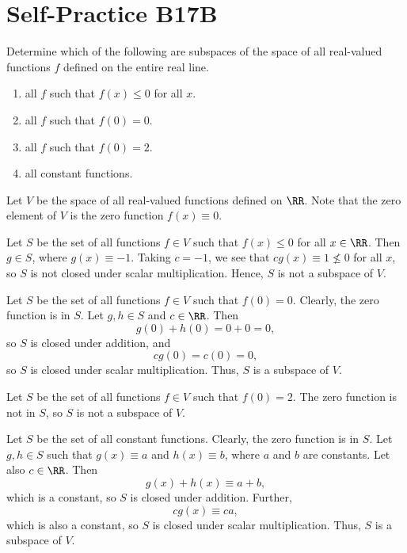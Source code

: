 \section{Self-Practice B17B}

\begin{problem}
    Determine which of the following are subspaces of the space of all real-valued functions $f$ defined on the entire real line.
    \begin{enumerate}
        \item all $f$ such that $f(x) \leq 0$ for all $x$.
        \item all $f$ such that $f(0) = 0$.
        \item all $f$ such that $f(0) = 2$.
        \item all constant functions.
    \end{enumerate}
\end{problem}
\begin{solution}
    Let $V$ be the space of all real-valued functions defined on $\RR$. Note that the zero element of $V$ is the zero function $f(x) \equiv 0$.

    \begin{ppart}
        Let $S$ be the set of all functions $f \in V$ such that $f(x) \leq 0$ for all $x \in \RR$. Then $g \in S$, where $g(x) \equiv -1$. Taking $c = -1$, we see that $cg(x) \equiv 1 \not\leq 0$ for all $x$, so $S$ is not closed under scalar multiplication. Hence, $S$ is not a subspace of $V$.
    \end{ppart}
    \begin{ppart}
        Let $S$ be the set of all functions $f \in V$ such that $f(0) = 0$. Clearly, the zero function is in $S$. Let $g, h \in S$ and $c \in \RR$. Then \[g(0) + h(0) = 0 + 0 = 0,\] so $S$ is closed under addition, and \[cg(0) = c(0) = 0,\] so $S$ is closed under scalar multiplication. Thus, $S$ is a subspace of $V$.
    \end{ppart}
    \begin{ppart}
        Let $S$ be the set of all functions $f \in V$ such that $f(0) = 2$. The zero function is not in $S$, so $S$ is not a subspace of $V$.
    \end{ppart}
    \begin{ppart}
        Let $S$ be the set of all constant functions. Clearly, the zero function is in $S$. Let $g, h \in S$ such that $g(x) \equiv a$ and $h(x) \equiv b$, where $a$ and $b$ are constants. Let also $c \in \RR$. Then \[g(x) + h(x) \equiv a + b,\] which is a constant, so $S$ is closed under addition. Further, \[cg(x) \equiv ca,\] which is also a constant, so $S$ is closed under scalar multiplication. Thus, $S$ is a subspace of $V$.
    \end{ppart}
\end{solution}

